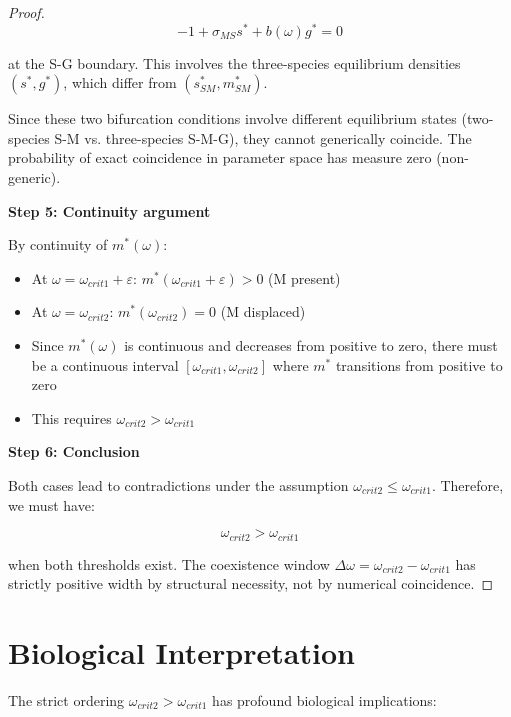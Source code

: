 \documentclass[11pt]{article}
\newtheorem{proof}{Proof}
\begin{document}
\begin{proof}
$$-1 + \sigma_{MS} s^* + b(\omega) g^* = 0$$

at the S-G boundary. This involves the three-species equilibrium densities $(s^*, g^*)$, which differ from $(s^*_{SM}, m^*_{SM})$.

Since these two bifurcation conditions involve different equilibrium states (two-species S-M vs. three-species S-M-G), they cannot generically coincide. The probability of exact coincidence in parameter space has measure zero (non-generic).

\textbf{Step 5: Continuity argument}

By continuity of $m^*(\omega)$:
\begin{itemize}
    \item At $\omega = \omega_{crit1} + \varepsilon$: $m^*(\omega_{crit1} + \varepsilon) > 0$ (M present)
    \item At $\omega = \omega_{crit2}$: $m^*(\omega_{crit2}) = 0$ (M displaced)
    \item Since $m^*(\omega)$ is continuous and decreases from positive to zero, there must be a continuous interval $[\omega_{crit1}, \omega_{crit2}]$ where $m^*$ transitions from positive to zero
    \item This requires $\omega_{crit2} > \omega_{crit1}$
\end{itemize}

\textbf{Step 6: Conclusion}

Both cases lead to contradictions under the assumption $\omega_{crit2} \leq \omega_{crit1}$. Therefore, we must have:

$$\boxed{\omega_{crit2} > \omega_{crit1}}$$

when both thresholds exist. The coexistence window $\Delta\omega = \omega_{crit2} - \omega_{crit1}$ has strictly positive width by structural necessity, not by numerical coincidence.
\end{proof}

\section*{Biological Interpretation}

The strict ordering $\omega_{crit2} > \omega_{crit1}$ has profound biological implications:
\end{document}
